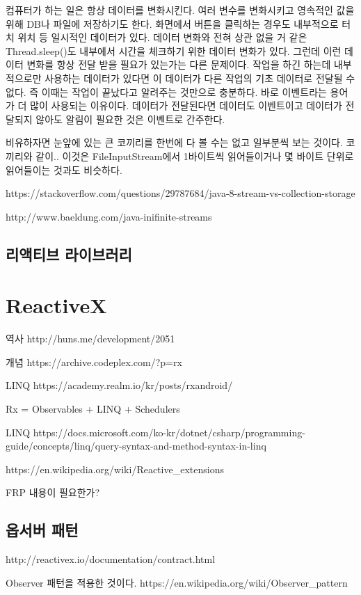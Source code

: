 \documentclass{book}
\begin{document}
컴퓨터가 하는 일은 항상 데이터를 변화시킨다. 여러 변수를 변화시키고 영속적인 값을 위해 DB나 파일에 저장하기도 한다. 화면에서 버튼을 클릭하는 경우도 내부적으로 터치 위치 등 일시적인 데이터가 있다. 데이터 변화와 전혀 상관 없을 거 같은 Thread.sleep()도 내부에서 시간을 체크하기 위한 데이터 변화가 있다. 그런데 이런 데이터 변화를 항상 전달 받을 필요가 있는가는 다른 문제이다. 작업을 하긴 하는데 내부적으로만 사용하는 데이터가 있다면 이 데이터가 다른 작업의 기초 데이터로 전달될 수 없다. 즉 이때는 작업이 끝났다고 알려주는 것만으로 충분하다. 바로 이벤트라는 용어가 더 많이 사용되는 이유이다. 데이터가 전달된다면 데이터도 이벤트이고 데이터가 전달되지 않아도 알림이 필요한 것은 이벤트로 간주한다. 

비유하자면 눈앞에 있는 큰 코끼리를 한번에 다 볼 수는 없고 일부분씩 보는 것이다. 코끼리와 같이.. 
이것은 FileInputStream에서 1바이트씩 읽어들이거나 몇 바이트 단위로 읽어들이는 것과도 비슷하다.


https://stackoverflow.com/questions/29787684/java-8-stream-vs-collection-storage

http://www.baeldung.com/java-inifinite-streams

\subsection{리액티브 라이브러리}

\section{ReactiveX}
역사
http://huns.me/development/2051

개념
https://archive.codeplex.com/?p=rx

LINQ
https://academy.realm.io/kr/posts/rxandroid/

Rx = Observables + LINQ + Schedulers

LINQ
https://docs.microsoft.com/ko-kr/dotnet/csharp/programming-guide/concepts/linq/query-syntax-and-method-syntax-in-linq

https://en.wikipedia.org/wiki/Reactive_extensions

FRP 내용이 필요한가?

\subsection{옵서버 패턴}
http://reactivex.io/documentation/contract.html

Observer 패턴을 적용한 것이다.
https://en.wikipedia.org/wiki/Observer_pattern
\end{document}
